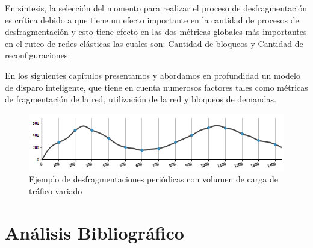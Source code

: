 En síntesis, la selección del momento para realizar el proceso de desfragmentación es crítica debido a que tiene un efecto importante en la cantidad de procesos de desfragmentación y esto tiene efecto en las dos métricas globales más importantes en el ruteo de redes elásticas las cuales son: Cantidad de bloqueos y Cantidad de reconfiguraciones. 

En los siguientes capítulos presentamos y abordamos en profundidad un modelo de disparo inteligente, que tiene en cuenta numerosos factores tales como métricas de fragmentación de la red, utilización de la red y bloqueos de demandas.
 
\begin{figure}[h!]
    \centering
    \includegraphics[width=1\textwidth]{capitulos/img/ejemploPeriodico.png}
    \caption{Ejemplo de desfragmentaciones periódicas con volumen de carga de tráfico variado}
    \label{fig:ejemploPeriodico}
\end{figure}



\section{Análisis Bibliográfico}     



